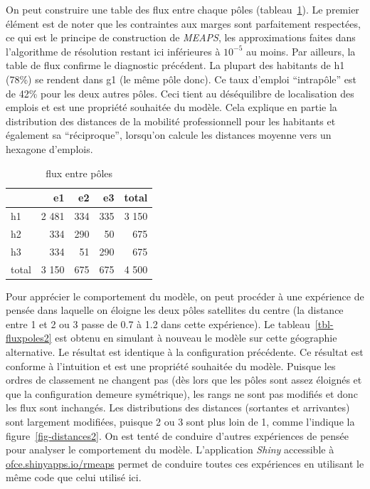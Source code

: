 \documentclass[
  10pt,
  a4paper,
  numbers=noendperiod,
  DIV=9]{scrartcl}
\begin{document}
On peut construire une table des flux entre chaque pôles
(tableau~\ref{tbl-fluxpoles}). Le premier élément est de noter que les
contraintes aux marges sont parfaitement respectées, ce qui est le
principe de construction de \emph{MEAPS}, les approximations faites dans
l'algorithme de résolution restant ici inférieures à \(10^{-5}\) au
moins. Par ailleurs, la table de flux confirme le diagnostic précédent.
La plupart des habitants de h1 (78\%) se rendent dans g1 (le même pôle
donc). Ce taux d'emploi ``intrapôle'' est de 42\% pour les deux autres
pôles. Ceci tient au déséquilibre de localisation des emplois et est une
propriété souhaitée du modèle. Cela explique en partie la distribution
des distances de la mobilité professionnell pour les habitants et
également sa ``réciproque'', lorsqu'on calcule les distances moyenne
vers un hexagone d'emplois.

\hypertarget{tbl-fluxpoles}{}
\begin{longtable}{lrrrr}
\caption{\label{tbl-fluxpoles}flux entre pôles }\tabularnewline

\toprule
 & e1 & e2 & e3 & total \\ 
\midrule
h1 & 2 481 & 334 & 335 & 3 150 \\ 
h2 & 334 & 290 & 50 & 675 \\ 
h3 & 334 & 51 & 290 & 675 \\ 
total & 3 150 & 675 & 675 & 4 500 \\ 
\bottomrule
\end{longtable}

Pour apprécier le comportement du modèle, on peut procéder à une
expérience de pensée dans laquelle on éloigne les deux pôles satellites
du centre (la distance entre 1 et 2 ou 3 passe de 0.7 à 1.2 dans cette
expérience). Le tableau~\ref{tbl-fluxpoles2} est obtenu en simulant à
nouveau le modèle sur cette géographie alternative. Le résultat est
identique à la configuration précédente. Ce résultat est conforme à
l'intuition et est une propriété souhaitée du modèle. Puisque les ordres
de classement ne changent pas (dès lors que les pôles sont assez
éloignés et que la configuration demeure symétrique), les rangs ne sont
pas modifiés et donc les flux sont inchangés. Les distributions des
distances (sortantes et arrivantes) sont largement modifiées, puisque 2
ou 3 sont plus loin de 1, comme l'indique la
figure~\ref{fig-distances2}. On est tenté de conduire d'autres
expériences de pensée pour analyser le comportement du modèle.
L'application \emph{Shiny} accessible à
\href{https://ofce.shinyapps.io/rmeaps}{ofce.shinyapps.io/rmeaps} permet
de conduire toutes ces expériences en utilisant le même code que celui
utilisé ici.
\end{document}
